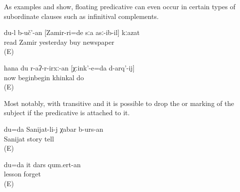 As examples  and  show, floating predicative  can even occur in certain types of subordinate clauses such as infinitival complements.
%
\begin{exe}
	\ex	\label{ex:I had to read the newspaper that ZAMIR bought yesterday@25a}
	\gll	du-l	b-uč'-an	[Zamir-ri=de	sːa	asː-ib-il]	kːazat\\
			read	Zamir	yesterday	buy	newspaper\\
	\glt	{} (E)

	\ex	\label{ex:Now I will / have to start to make KHINKAL@6}
	\gll	hana	du	r-aʔ-r-irxː-an	[χːink'-e=da	d-arq'-ij]\\
		now		beginbegin	khinkal	do\\
	\glt	{} (E)
\end{exe}

Most notably, with transitive and  it is possible to drop the  or  marking of the subject if the predicative  is attached to it.
%
\begin{exe}
	\ex	\label{ex:I will / have to tell Sanijat the story@8a}
	\gll	du=da	Sanijat-li-j	χabar	b-urs-an\\
			Sanijat	story	tell\\
	\glt	{} (E)

	\ex	\label{ex:I will not forget this lesson@8b}
	\gll	du=da	it	dars	qum.ert-an\\
				lesson	forget\\
	\glt	{} (E)
\end{exe}

